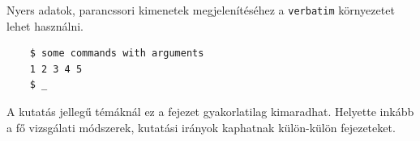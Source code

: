 Nyers adatok, parancssori kimenetek megjelenítéséhez a \texttt{verbatim} környezetet lehet használni.
\begin{verbatim}
    $ some commands with arguments
    1 2 3 4 5
    $ _
\end{verbatim}

A kutatás jellegű témáknál ez a fejezet gyakorlatilag kimaradhat.
Helyette inkább a fő vizsgálati módszerek, kutatási irányok kaphatnak külön-külön fejezeteket.
